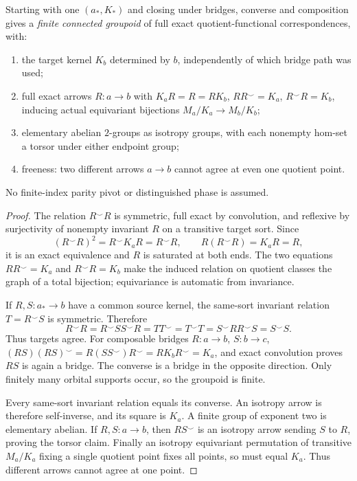 \begin{theorem}
\label{thm:foundational-rigid-groupoid}
Starting with one $(a_*,K_*)$ and closing under bridges, converse
and composition gives a \emph{finite connected groupoid} of
full exact quotient-functional correspondences, with:
\begin{enumerate}[label=(\roman*),leftmargin=*]
\item the target kernel $K_b$ determined by $b$, independently
of which bridge path was used;
\item full exact arrows $R:a\to b$ with
$K_aR=R=RK_b$, $RR^\smile=K_a$,
$R^\smile R=K_b$, inducing actual equivariant bijections
$M_a/K_a\to M_b/K_b$;
\item elementary abelian $2$-groups as isotropy groups,
with each nonempty hom-set a torsor under either endpoint group;
\item freeness: two different arrows $a\to b$ cannot agree
at even one quotient point.
\end{enumerate}
No finite-index parity pivot or distinguished phase is assumed.
\end{theorem}
\begin{proof}
The relation $R^\smile R$ is symmetric, full exact by convolution,
and reflexive by surjectivity of nonempty invariant $R$ on a
transitive target sort. Since
\[
 (R^\smile R)^2=R^\smile K_aR=R^\smile R,\qquad
 R(R^\smile R)=K_aR=R,
\]
it is an exact equivalence and $R$ is saturated at both ends.
The two equations $RR^\smile=K_a$ and $R^\smile R=K_b$
make the induced relation on quotient classes the graph of a
total bijection; equivariance is automatic from invariance.

If $R,S:a_*\to b$ have a common source kernel, the same-sort
invariant relation $T=R^\smile S$ is symmetric. Therefore
\[
 R^\smile R=R^\smile SS^\smile R=TT^\smile
          =T^\smile T=S^\smile RR^\smile S=S^\smile S .
\]
Thus targets agree. For composable bridges $R:a\to b$,
$S:b\to c$, $(RS)(RS)^\smile
=R(SS^\smile)R^\smile=RK_bR^\smile=K_a$,
and exact convolution proves $RS$ is again a bridge.
The converse is a bridge in the opposite direction.
Only finitely many orbital supports occur, so the groupoid
is finite.

Every same-sort invariant relation equals its converse.
An isotropy arrow is therefore self-inverse, and its square
is $K_a$. A finite group of exponent two is elementary
abelian. If $R,S:a\to b$, then $RS^\smile$ is an isotropy
arrow sending $S$ to $R$, proving the torsor claim.
Finally an isotropy equivariant permutation of transitive
$M_a/K_a$ fixing a single quotient point fixes all points,
so must equal $K_a$. Thus different arrows cannot agree
at one point.
\end{proof}

